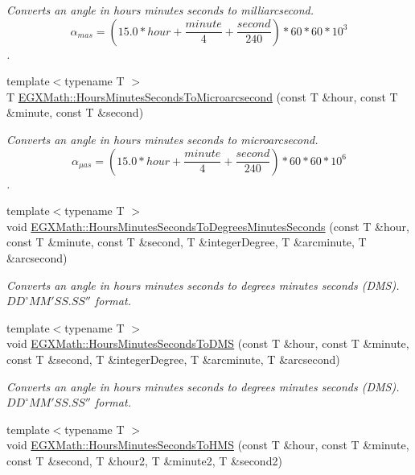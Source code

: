 \begin{DoxyCompactItemize}
\begin{DoxyCompactList}\small\item\em Converts an angle in hours minutes seconds to milliarcsecond. \[\alpha_{mas}=(15.0 * hour + \frac{minute}{4} + \frac{second}{240}) * 60 * 60 * 10^3\]. \end{DoxyCompactList}\item 
{\footnotesize template$<$typename T $>$ }\\T \mbox{\hyperlink{group___e_g_x_math-_angle_conversions-_hours_minutes_seconds_ga061e4fa10d73e459d5f411cfe436bbe3}{E\+G\+X\+Math\+::\+Hours\+Minutes\+Seconds\+To\+Microarcsecond}} (const T \&hour, const T \&minute, const T \&second)
\begin{DoxyCompactList}\small\item\em Converts an angle in hours minutes seconds to microarcsecond. \[\alpha_{\mu as}=(15.0 * hour + \frac{minute}{4} + \frac{second}{240}) * 60 * 60 * 10^6\]. \end{DoxyCompactList}\item 
{\footnotesize template$<$typename T $>$ }\\void \mbox{\hyperlink{group___e_g_x_math-_angle_conversions-_hours_minutes_seconds_gae9eb0acc65dfe6119936f29ac292afaa}{E\+G\+X\+Math\+::\+Hours\+Minutes\+Seconds\+To\+Degrees\+Minutes\+Seconds}} (const T \&hour, const T \&minute, const T \&second, T \&integer\+Degree, T \&arcminute, T \&arcsecond)
\begin{DoxyCompactList}\small\item\em Converts an angle in hours minutes seconds to degrees minutes seconds (D\+MS). ${DD}^{\circ}{MM}'{SS.SS}''$ format. \end{DoxyCompactList}\item 
{\footnotesize template$<$typename T $>$ }\\void \mbox{\hyperlink{group___e_g_x_math-_angle_conversions-_hours_minutes_seconds_ga8fe72f56eebb44d7e8d7033476bbdd9b}{E\+G\+X\+Math\+::\+Hours\+Minutes\+Seconds\+To\+D\+MS}} (const T \&hour, const T \&minute, const T \&second, T \&integer\+Degree, T \&arcminute, T \&arcsecond)
\begin{DoxyCompactList}\small\item\em Converts an angle in hours minutes seconds to degrees minutes seconds (D\+MS). ${DD}^{\circ}{MM}'{SS.SS}''$ format. \end{DoxyCompactList}\item 
{\footnotesize template$<$typename T $>$ }\\void \mbox{\hyperlink{group___e_g_x_math-_angle_conversions-_hours_minutes_seconds_ga5ac65e4e7ed8857151b3f81f5928df3a}{E\+G\+X\+Math\+::\+Hours\+Minutes\+Seconds\+To\+H\+MS}} (const T \&hour, const T \&minute, const T \&second, T \&hour2, T \&minute2, T \&second2)

\end{DoxyCompactItemize}
